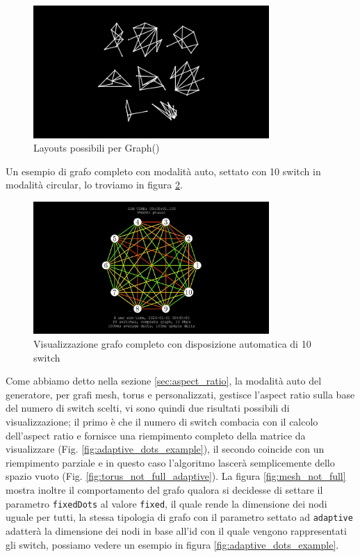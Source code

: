 \documentclass[binding=0.6cm]{sapthesis}
\begin{document}
\begin{figure}[h]
    \centering
    \includegraphics[width=0.8\textwidth]{immagini/graph_layouts_types.png}
    \caption{Layouts possibili per Graph()}
    \label{fig:graph_layouts_types}
\end{figure}


Un esempio di grafo completo con modalità auto, settato con 10 switch in modalità circular, lo troviamo in figura \ref{fig:custom_complete_autopositioning10}.

\begin{figure}[h]
    \centering
    \includegraphics[width=0.8\textwidth]{immagini/auto_complete_10.JPG}
    \caption{Visualizzazione grafo completo con disposizione automatica di 10 switch}
    \label{fig:custom_complete_autopositioning10}
\end{figure}

Come abbiamo detto nella sezione \ref{sec:aspect_ratio}, la modalità auto del generatore, per grafi mesh, torus e personalizzati, gestisce l'aspect ratio sulla base del numero di switch scelti, vi sono quindi
due risultati possibili di visualizzazione; il primo è che il numero di switch combacia con il calcolo dell'aspect ratio e fornisce una riempimento
completo della matrice da visualizzare (Fig. \ref{fig:adaptive_dots_example}), 
il secondo coincide con un riempimento parziale e in questo caso l'algoritmo lascerà semplicemente dello spazio vuoto (Fig. \ref{fig:torus_not_full_adaptive}).
La figura \ref{fig:mesh_not_full} mostra inoltre il comportamento del grafo qualora si decidesse di settare il parametro \lstinline|fixedDots| al valore \lstinline|fixed|, 
il quale rende la dimensione dei nodi uguale per tutti, la stessa tipologia di grafo con il parametro settato ad \lstinline|adaptive| adatterà la dimensione dei nodi
in base all'id con il quale vengono rappresentati gli switch, possiamo vedere un esempio in figura \ref{fig:adaptive_dots_example}.
\end{document}
